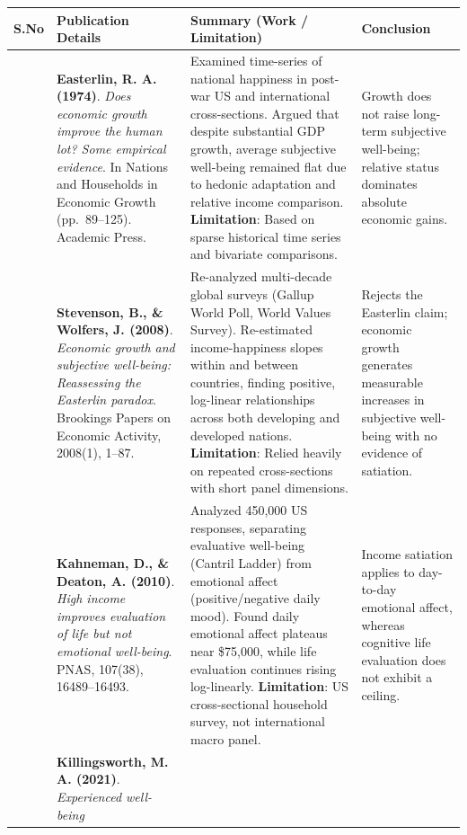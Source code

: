 \documentclass[
]{article}
\begin{document}
\begin{longtable}[]{@{}
  >{\centering\arraybackslash}p{}
  >{\raggedright\arraybackslash}p{}
  >{\raggedright\arraybackslash}p{}
  >{\raggedright\arraybackslash}p{}@{}}
\toprule
S.No & Publication Details & Summary (Work / Limitation) & Conclusion \\
\midrule
\endhead
1 & \textbf{Easterlin, R. A. (1974)}. \emph{Does economic growth improve
the human lot? Some empirical evidence}. In Nations and Households in
Economic Growth (pp.~89--125). Academic Press. & Examined time-series of
national happiness in post-war US and international cross-sections.
Argued that despite substantial GDP growth, average subjective
well-being remained flat due to hedonic adaptation and relative income
comparison. \textbf{Limitation}: Based on sparse historical time series
and bivariate comparisons. & Growth does not raise long-term subjective
well-being; relative status dominates absolute economic gains. \\
2 & \textbf{Stevenson, B., \& Wolfers, J. (2008)}. \emph{Economic growth
and subjective well-being: Reassessing the Easterlin paradox}. Brookings
Papers on Economic Activity, 2008(1), 1--87. & Re-analyzed multi-decade
global surveys (Gallup World Poll, World Values Survey). Re-estimated
income-happiness slopes within and between countries, finding positive,
log-linear relationships across both developing and developed nations.
\textbf{Limitation}: Relied heavily on repeated cross-sections with
short panel dimensions. & Rejects the Easterlin claim; economic growth
generates measurable increases in subjective well-being with no evidence
of satiation. \\
3 & \textbf{Kahneman, D., \& Deaton, A. (2010)}. \emph{High income
improves evaluation of life but not emotional well-being}. PNAS,
107(38), 16489--16493. & Analyzed 450,000 US responses, separating
evaluative well-being (Cantril Ladder) from emotional affect
(positive/negative daily mood). Found daily emotional affect plateaus
near \$75,000, while life evaluation continues rising log-linearly.
\textbf{Limitation}: US cross-sectional household survey, not
international macro panel. & Income satiation applies to day-to-day
emotional affect, whereas cognitive life evaluation does not exhibit a
ceiling. \\
4 & \textbf{Killingsworth, M. A. (2021)}. \emph{Experienced well-being
}
\end{longtable}
\end{document}
